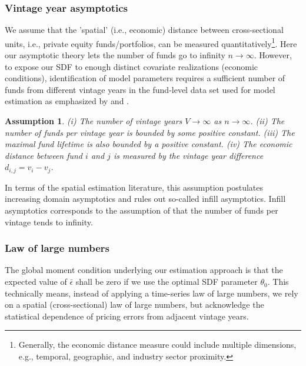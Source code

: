 \documentclass[12pt]{article}
\newtheorem{assume}{Assumption}
\begin{document}
\subsubsection{Vintage year asymptotics}
We assume that the 'spatial' (i.e., economic) distance between cross-sectional units, i.e., private equity funds/portfolios, can be measured quantitatively\footnote{Generally, the economic distance measure could include multiple dimensions, e.g., temporal, geographic, and industry sector proximity.}.
Here our asymptotic theory lets the number of funds go to infinity $n \to \infty$.
However, to expose our SDF to enough distinct covariate realizations (economic conditions), identification of model parameters requires a sufficient number of funds from different vintage years in the fund-level data set used for model estimation as emphasized by \cite{DLP12} and \cite{KN16}.
\begin{assume}
	\label{as:vya}
	(i) The number of vintage years $V \to \infty$ as $n \to \infty$.
	(ii) The number of funds per vintage year is bounded by some positive constant.
	(iii) The maximal fund lifetime is also bounded by a positive constant.
	(iv) The economic distance between fund $i$ and $j$ is measured by the vintage year difference $d_{i,j}=v_i - v_j$.
\end{assume}
In terms of the spatial estimation literature, this assumption postulates increasing domain asymptotics and rules out so-called infill asymptotics. Infill asymptotics corresponds to the assumption of \cite{DLP12} that the number of funds per vintage tends to infinity.


\subsubsection{Law of large numbers}
The global moment condition underlying our estimation approach is that the expected value of $\bar{\epsilon}$ shall be zero if we use the optimal SDF parameter $\theta_0$. 
This technically means, instead of applying a time-series law of large numbers, we rely on a spatial (cross-sectional) law of large numbers, but acknowledge the statistical dependence of  pricing errors from adjacent vintage years.
\end{document}
